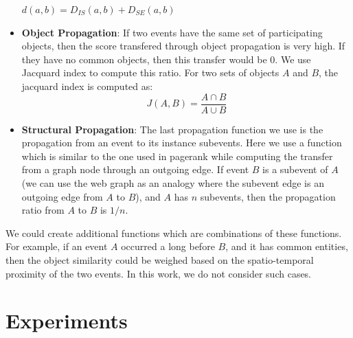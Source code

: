 \begin{itemize}
$d(a, b) = D_{IS}(a, b) + D_{SE}(a, b)$

\item \textbf{Object Propagation}: If two events have the same set of participating objects, then the score transfered through object propagation is very high. If they have no common objects, then this transfer would be 0. We use Jacquard index to compute this ratio. For two sets of objects $A$ and $B$, the jacquard index is computed as:
\begin{equation}
J(A, B) = \frac{A \cap B}{A \cup B} \nonumber
\end{equation}

\item \textbf{Structural Propagation}: The last propagation function we use is the propagation from an event to its instance subevents. Here we use a function which is similar to the one used in pagerank while computing the transfer from a graph node through an outgoing edge. If event $B$ is a subevent of $A$ (we can use the web graph as an analogy where the subevent edge is an outgoing edge from $A$ to $B$), and $A$ has $n$ subevents, then the propagation ratio from $A$ to $B$ is $1/n$.

\end{itemize}

We could create additional functions which are combinations of these functions. For example, if an event $A$ occurred a long before $B$, and it has common entities, then the object similarity could be weighed based on the spatio-temporal proximity of the two events. In this work, we do not consider such cases.

\section{Experiments}

